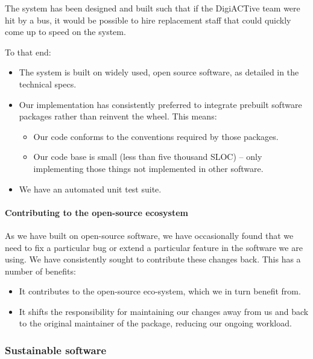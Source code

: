 \documentclass[12pt,a4paper,twosided]{article}
\begin{document}
The system has been designed and built such that if the DigiACTive team
were hit by a bus, it would be possible to hire replacement staff that
could quickly come up to speed on the system.

To that end:

\begin{itemize}

\item
  The system is built on widely used, open source software, as detailed
  in the technical specs.
\item
  Our implementation has consistently preferred to integrate prebuilt
  software packages rather than reinvent the wheel. This means:

  \begin{itemize}
  
  \item
    Our code conforms to the conventions required by those packages.
  \item
    Our code base is small (less than five thousand SLOC) -- only
    implementing those things not implemented in other software.
  \end{itemize}
\item
  We have an automated unit test suite.
\end{itemize}

\paragraph{Contributing to the open-source ecosystem}

As we have built on open-source software, we have occasionally found
that we need to fix a particular bug or extend a particular feature in
the software we are using. We have consistently sought to contribute
these changes back. This has a number of benefits:

\begin{itemize}

\item
  It contributes to the open-source eco-system, which we in turn benefit
  from.
\item
  It shifts the responsibility for maintaining our changes away from us
  and back to the original maintainer of the package, reducing our
  ongoing workload.
\end{itemize}

\subsubsection{Sustainable software}
\end{document}
